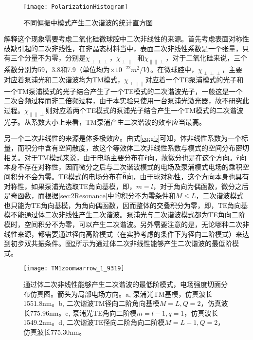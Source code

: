 \begin{figure}
\centering
\texttt{[image: PolarizationHistogram]}
\caption{不同偏振中模式产生二次谐波的统计直方图}
\label{pic:PolarizationHistogram}
\end{figure}

解释这个现象需要考虑二氧化硅微球腔中二次非线性的来源。首先考虑表面对称性破缺引起的二次非线性，在非晶态材料当中，表面二次非线性系数是一个张量，只有三个分量不为零，分别是$\chi_{\perp \perp \perp}$，$\chi_{\perp \parallel \parallel}$和$\chi_{\parallel \parallel \perp}$，对于二氧化硅来说，三个系数分别为59，3.8和7.9（单位均为$\times 10^{-22} m^2/V$）。在微球腔中，$\chi_{\perp \perp \perp}$，主要对应着泵浦光和二次谐波均为TM模式，$\chi_{\perp \parallel \parallel}$对应着一个TE泵浦模式的光子和一个TM泵浦模式的光子结合产生了一个TE模式的二次谐波光子，一般这是一个二次合频过程而非二倍频过程，由于本实验只使用一台泵浦光激光器，故不研究此过程。$\chi_{\parallel \parallel \perp}$则对应着两个TE模式的泵浦光子结合产生一个TM模式的二次谐波光子。从系数大小上来看，TM泵浦产生二次谐波的效率应当最高。

另一个二次非线性的来源是体多极效应。由式\ref{eq:gb}可知，体非线性系数为一个标量，而积分中含有空间散度，故这个等效体二次非线性系数与模式的空间分布密切相关。对于TM模式来说，由于电场主要分布在$\mathbf{\hat{r}} $向，故微分也是在这个方向。$\mathbf{\hat{r}} $向本身不存在对称性，因而微分之后与二次谐波模式的电场及泵浦模式电场的乘积空间积分不会为零。TE模式的电场分布在$\mathbf{\hat{\theta}} $向，由于球对称性，这个方向本身也具有对称性，如果泵浦光选取TE角向基模，即，$m=l$，对于角向为偶函数，微分之后是奇函数，而根据\ref{sec:2Resonance}中的积分不为零条件和$M\le L$，二次谐波模式也只能为TE角向基模，为角向偶函数，因而整体的交叠积分为零，即，TE角向基模不能通过体二次非线性产生二次谐波。泵浦光与二次谐波模式都为TE角向二阶模时，空间积分不为零，可以产生二次谐波。另外需要注意的是，无论哪种二次非线性来源，都需要通过径向高阶模式（在实验考虑的条件下为径向二阶模式）来达到初步双共振条件。图\ref{pic:TM1zoomwarrow_1_9319}所示为通过体二次非线性能够产生二次谐波的最低阶模式。

\begin{figure}
\centering
\texttt{[image: TM1zoomwarrow\_1\_9319]}
\caption{通过体二次非线性能够产生二次谐波的最低阶模式，电场强度切面分布仿真图。箭头为局部电场方向。a, 泵浦光TM基模，仿真波长1551.8nm。b, 二次谐波TM径向二阶角向基模$M=L, Q=2$，仿真波长775.96nm。c, 泵浦光TE角向二阶模$m=l-1, q=1$，仿真波长1549.2nm。d, 二次谐波TE径向二阶角向二阶模$M=L-1, Q=2$，仿真波长775.30nm。}
\label{pic:TM1zoomwarrow_1_9319}
\end{figure}

